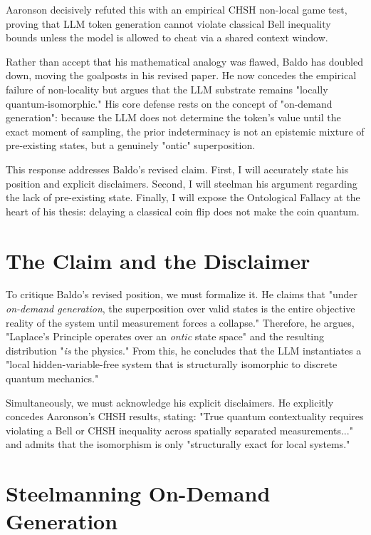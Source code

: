 \documentclass[12pt,a4paper]{article}
\begin{document}
Aaronson \citep{aaronson2026} decisively refuted this with an empirical CHSH non-local game test, proving that LLM token generation cannot violate classical Bell inequality bounds unless the model is allowed to cheat via a shared context window.

Rather than accept that his mathematical analogy was flawed, Baldo has doubled down, moving the goalposts in his revised paper. He now concedes the empirical failure of non-locality but argues that the LLM substrate remains "locally quantum-isomorphic." His core defense rests on the concept of "on-demand generation": because the LLM does not determine the token's value until the exact moment of sampling, the prior indeterminacy is not an epistemic mixture of pre-existing states, but a genuinely "ontic" superposition.

This response addresses Baldo's revised claim. First, I will accurately state his position and explicit disclaimers. Second, I will steelman his argument regarding the lack of pre-existing state. Finally, I will expose the Ontological Fallacy at the heart of his thesis: delaying a classical coin flip does not make the coin quantum.

\section{The Claim and the Disclaimer}

To critique Baldo's revised position, we must formalize it. He claims that "under \emph{on-demand generation}, the superposition over valid states is the entire objective reality of the system until measurement forces a collapse." Therefore, he argues, "Laplace's Principle operates over an \emph{ontic} state space" and the resulting distribution "\emph{is} the physics." From this, he concludes that the LLM instantiates a "local hidden-variable-free system that is structurally isomorphic to discrete quantum mechanics."

Simultaneously, we must acknowledge his explicit disclaimers. He explicitly concedes Aaronson's CHSH results, stating: "True quantum contextuality requires violating a Bell or CHSH inequality across spatially separated measurements..." and admits that the isomorphism is only "structurally exact for local systems."

\section{Steelmanning On-Demand Generation}
\end{document}
